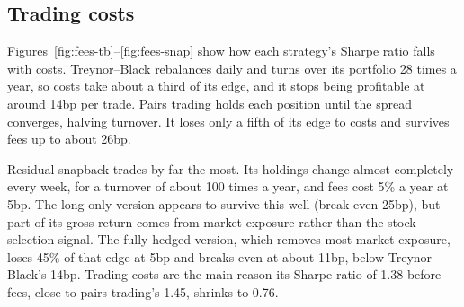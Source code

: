 \documentclass[11pt,letterpaper]{article}
\begin{document}
\subsection{Trading costs}

Figures~\ref{fig:fees-tb}--\ref{fig:fees-snap} show how each strategy's Sharpe ratio falls
with costs. Treynor--Black rebalances daily and turns over its portfolio 28 times a year, so
costs take about a third of its edge, and it stops being profitable at around 14bp per
trade. Pairs trading holds each position until the spread converges, halving turnover. It
loses only a fifth of its edge to costs and survives fees up to about 26bp.

Residual snapback trades by far the most. Its holdings change almost completely every week,
for a turnover of about 100 times a year, and fees cost 5\% a year at 5bp. The long-only
version appears to survive this well (break-even 25bp), but part of its gross return comes
from market exposure rather than the stock-selection signal. The fully hedged version, which
removes most market exposure, loses 45\% of that edge at 5bp and breaks even at about 11bp,
below Treynor--Black's 14bp. Trading costs are the main reason its Sharpe ratio of 1.38
before fees, close to pairs trading's 1.45, shrinks to 0.76.
\end{document}
